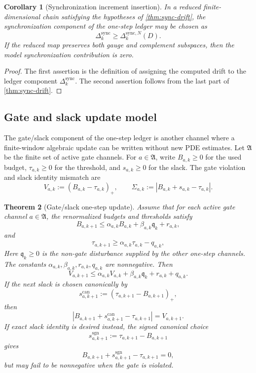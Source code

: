 \documentclass[11pt]{article}
\numberwithin{equation}{section}
\theoremstyle{plain}
\newtheorem{theorem}{Theorem}[section]
\newtheorem{corollary}[theorem]{Corollary}
\theoremstyle{definition}
\theoremstyle{remark}
\newcommand{\sync}{\mathrm{sync}}
\newcommand{\abs}[1]{\left\lvert #1\right\rvert}
\begin{document}
\begin{corollary}[Synchronization increment insertion]\label{cor:sync-insertion}
In a reduced finite-dimensional chain satisfying the hypotheses of
\cref{thm:sync-drift}, the synchronization component of the one-step ledger
may be chosen as
\[
  \Delta_k^{\sync}
  \ge
  \Delta_k^{\sync,N}(D).
\]
If the reduced map preserves both gauge and complement subspaces, then the
model synchronization contribution is zero.
\end{corollary}

\begin{proof}
The first assertion is the definition of assigning the computed drift to the
ledger component \(\Delta_k^{\sync}\).  The second assertion follows from
the last part of \cref{thm:sync-drift}.
\end{proof}

\subsection{Gate and slack update model}

The gate/slack component of the one-step ledger is another channel where a
finite-window algebraic update can be written without new PDE estimates.  Let
\(\mathfrak A\) be the finite set of active gate channels.  For
\(a\in\mathfrak A\), write \(B_{a,k}\ge0\) for the used budget,
\(\tau_{a,k}\ge0\) for the threshold, and \(s_{a,k}\ge0\) for the slack.
The gate violation and slack identity mismatch are
\[
  V_{a,k}:=(B_{a,k}-\tau_{a,k})_+,
  \qquad
  \Sigma_{a,k}:=\abs{B_{a,k}+s_{a,k}-\tau_{a,k}}.
\]

\begin{theorem}[Gate/slack one-step update]\label{thm:gate-update}
Assume that for each active gate channel \(a\in\mathfrak A\), the
renormalized budgets and thresholds satisfy
\[
  B_{a,k+1}
  \le
  \alpha_{a,k}B_{a,k}+\beta_{a,k}\mathfrak q_k+r_{a,k},
\]
and
\[
  \tau_{a,k+1}
  \ge
  \alpha_{a,k}\tau_{a,k}-q_{a,k},
\]
Here \(\mathfrak q_k\ge0\) is the non-gate disturbance supplied by the other
one-step channels.  The constants
\(\alpha_{a,k},\beta_{a,k},r_{a,k},q_{a,k}\) are nonnegative.  Then
\[
  V_{a,k+1}
  \le
  \alpha_{a,k}V_{a,k}
  +\beta_{a,k}\mathfrak q_k+r_{a,k}+q_{a,k}.
\]
If the next slack is chosen canonically by
\[
  s_{a,k+1}^{\mathrm{can}}:=(\tau_{a,k+1}-B_{a,k+1})_+,
\]
then
\[
  \abs{B_{a,k+1}+s_{a,k+1}^{\mathrm{can}}-\tau_{a,k+1}}
  =
  V_{a,k+1}.
\]
If exact slack identity is desired instead, the signed canonical choice
\[
  s_{a,k+1}^{\mathrm{sgn}}:=\tau_{a,k+1}-B_{a,k+1}
\]
gives
\[
  B_{a,k+1}+s_{a,k+1}^{\mathrm{sgn}}-\tau_{a,k+1}=0,
\]
but may fail to be nonnegative when the gate is violated.
\end{theorem}
\end{document}
